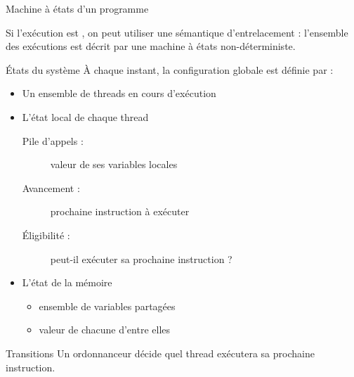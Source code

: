 
\begingroup

\begin{frame}[fragile]{Machine à états d'un programme}

  Si l'exécution est , on peut utiliser une \alert{sémantique d'entrelacement} :
  l'ensemble des exécutions est décrit par une \alert{machine à états non-déterministe}.

  \begin{block}{États du système}
    À chaque instant, la \alert{configuration globale} est définie par :
    \begin{itemize}
    \item Un ensemble de threads en cours d'exécution
    \item L'état local de chaque thread
      \begin{description}
      \item[Pile d'appels :] valeur de ses variables locales
      \item[Avancement :] prochaine instruction à exécuter
      \item[Éligibilité :] peut-il exécuter sa prochaine instruction ? 
      \end{description}
    \item L'état de la mémoire
      \begin{itemize}
      \item ensemble de variables partagées
      \item valeur de chacune d'entre elles
      \end{itemize}
    \end{itemize}
  \end{block}

  \begin{block}{Transitions}
    Un \alert{ordonnanceur} décide quel thread exécutera sa prochaine instruction.
  \end{block}

\end{frame}

\endgroup
\endinput
